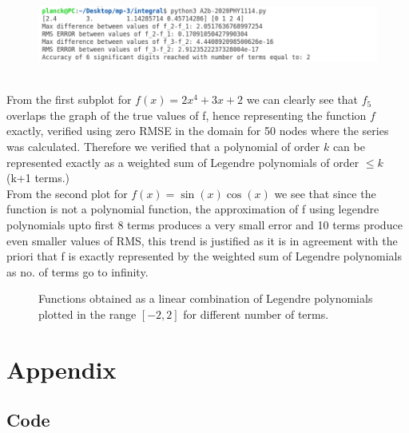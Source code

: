 \documentclass[12pt]{article}
\begin{document}
\begin{figure}[H]
	\centering
	\includegraphics[width=\linewidth]{part2_output.png}
\end{figure}

\noindent \\
From the first subplot for $f(x) = 2 x^4 + 3x + 2$ we can clearly see that $f_5$ overlaps the graph of the true values of f, hence representing the function $f$ exactly, verified using zero RMSE in the domain for 50 nodes where the series was calculated.
Therefore we verified that a polynomial of order $k$ can be represented exactly as a weighted sum of Legendre polynomials of order $\leq k$ (k+1 terms.)
\\
\noindent 
From the second plot for $ f(x) = \sin(x)\cos(x) $ we see that since the function is not a polynomial function, the approximation of f using legendre polynomials upto first 8 terms produces a very small error and 10 terms produce even smaller values of RMS, this trend is justified as it is in agreement with the priori that f is exactly represented by the weighted sum of Legendre polynomials as no. of terms go to infinity.
\\

\begin{figure}[H]
	\centering
	\def\svgwidth{\columnwidth}
	
	\caption{Functions obtained as a linear combination of Legendre polynomials plotted in the range $[-2,2]$ for different number of terms.}
\end{figure}

\section{Appendix}

\subsection{Code}



\end{document}
